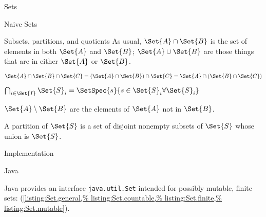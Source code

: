 \begin{plSection}{Sets}
\begin{plSection}{Naive Sets}
\begin{plSection}{Subsets, partitions, and quotients}
As usual, $\Set{A} \cap \Set{B}$ is the set of elements in both 
$\Set{A}$ and $\Set{B}$; $\Set{A} \cup \Set{B}$ are those things
that are in either $\Set{A}$ or $\Set{B}$.

$\Set{A} \cap \Set{B} \cap \Set{C} 
= (\Set{A} \cap \Set{B}) \cap \Set{C} 
= \Set{A} \cap (\Set{B} \cap \Set{C}) $

$\bigcap_{i \in \Set{I}} \Set{S}_{i} = 
\SetSpec{ s }{ s \in \Set{S}_{i} \forall \Set{S}_{i} }$

$\Set{A} \setminus \Set{B}$ are the elements of $\Set{A}$ 
not in $\Set{B}$.

A partition of $\Set{S}$ is a set of disjoint nonempty subsets of
$\Set{S}$ whose union is $\Set{S}$.
\end{plSection}%

\begin{plSection}{Implementation}
\begin{plSection}{Java}
\lstset{language=Java}

Java provides an interface \lstinline|java.util.Set| intended for
possibly mutable, finite sets: 
(\cref{listing:Set.general,%
listing:Set.countable,%
listing:Set.finite,%
listing:Set.mutable}).


\end{plSection}
\end{plSection}
\end{plSection}
\end{plSection}
